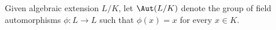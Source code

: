  Given algebraic extension $L/K$, let $\Aut(L/K)$ denote the group of field automorphisms $\phi: L \to L$ such that $\phi(x) = x$ for every $x \in K.$